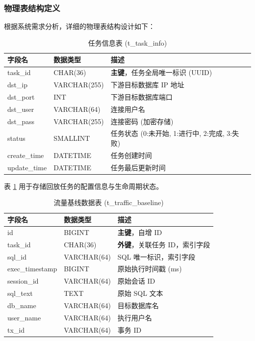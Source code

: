 \subsubsection{物理表结构定义}
根据系统需求分析，详细的物理表结构设计如下：

\begin{table}[htbp]
    \centering
    \caption{任务信息表 (t\_task\_info)}
    \label{tab:task_info}
    \begin{tabular}{l l p{6cm}}
        \toprule
        \textbf{字段名} & \textbf{数据类型} & \textbf{描述} \\
        \midrule
        task\_id & CHAR(36) & \textbf{主键}，任务全局唯一标识 (UUID) \\
        dst\_ip & VARCHAR(255) & 下游目标数据库 IP 地址 \\
        dst\_port & INT & 下游目标数据库端口 \\
        dst\_user & VARCHAR(64) & 连接用户名 \\
        dst\_pass & VARCHAR(255) & 连接密码 (加密存储) \\
        status & SMALLINT & 任务状态 (0:未开始, 1:进行中, 2:完成, 3:失败) \\
        create\_time & DATETIME & 任务创建时间 \\
        update\_time & DATETIME & 任务最后更新时间 \\
        \bottomrule
    \end{tabular}
\end{table}

表 \ref{tab:task_info} 用于存储回放任务的配置信息与生命周期状态。

\begin{table}[htbp]
    \centering
    \caption{流量基线数据表 (t\_traffic\_baseline)}
    \label{tab:traffic_baseline}
    \begin{tabular}{l l p{6cm}}
        \toprule
        \textbf{字段名} & \textbf{数据类型} & \textbf{描述} \\
        \midrule
        id & BIGINT & \textbf{主键}，自增 ID \\
        task\_id & CHAR(36) & \textbf{外键}，关联任务 ID，索引字段 \\
        sql\_id & VARCHAR(64) & SQL 唯一标识，索引字段 \\
        exec\_timestamp & BIGINT & 原始执行时间戳 (ms) \\
        session\_id & VARCHAR(64) & 原始会话 ID \\
        sql\_text & TEXT & 原始 SQL 文本 \\
        db\_name & VARCHAR(64) & 目标数据库名 \\
        user\_name & VARCHAR(64) & 执行用户名 \\
        tx\_id & VARCHAR(64) & 事务 ID \\
        \bottomrule
    \end{tabular}
\end{table}

